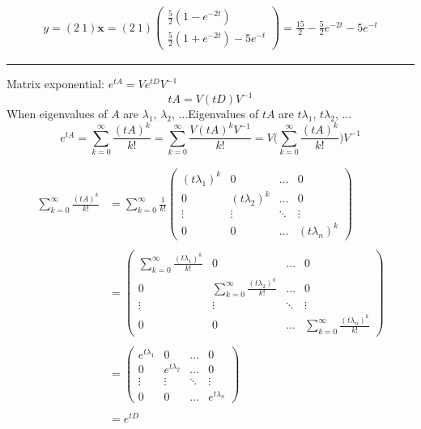 \documentclass[12pt,a4paper]{article}
\begin{document}
\begin{tcolorbox}[breakable]
\begin{gather*}
y = (2 \ 1)\mathbf{x} = (2 \ 1)\begin{pmatrix}
\frac{5}{2}(1-e^{-2t})\\
\frac{5}{2}(1+e^{-2t})-5e^{-t}
\end{pmatrix}
 = \frac{15}{2}-\frac{5}{2}e^{-2t}-5e^{-t}
\end{gather*}

\vspace{.3cm}\hrule\vspace{.3cm}
Matrix exponential: $e^{tA} = Ve^{tD}V^{-1}$
\[tA = V(tD)V^{-1}\]
When eigenvalues of $A$ are $\lambda_{1}$, $\lambda_{2}$, ...Eigenvalues of $tA$ are $t\lambda_{1}$, $t\lambda_{2}$, ...
\[e^{tA} = \sum^{\infty}_{k=0}\frac{(tA)^{k}}{k!} =\sum^{\infty}_{k=0}\frac{V(tA)^{k}V^{-1}}{k!} = V\bigg(\sum^{\infty}_{k=0}\frac{(tA)^{k}}{k!}\bigg)V^{-1} \]

\begin{equation*}
\begin{aligned}
\sum^{\infty}_{k=0}\frac{(tA)^{k}}{k!}  &=\sum^{\infty}_{k=0}\frac{1}{k!} \begin{pmatrix}
(t\lambda_{1})^{k}&0&\ldots&0\\
0&(t\lambda_{2})^{k}&\ldots&0\\
\vdots&\vdots&\ddots&\vdots\\
0&0&\ldots&(t\lambda_{n})^{k}
\end{pmatrix}\\\\
&=\begin{pmatrix}
\sum^{\infty}_{k=0}\frac{(t\lambda_{1})^{k}}{k!} &0&\ldots&0\\
0& \sum^{\infty}_{k=0}\frac{(t\lambda_{2})^{k}}{k!}&\ldots&0\\
\vdots&\vdots&\ddots&\vdots\\
0&0&\ldots&\sum^{\infty}_{k=0}\frac{(t\lambda_{n})^{k}}{k!}
\end{pmatrix}\\\\
&=\begin{pmatrix}
e^{t\lambda_{1}}&0&\ldots&0\\
0&e^{t\lambda_{2}}&\ldots&0\\
\vdots&\vdots&\ddots&\vdots\\
0&0&\ldots&e^{t\lambda_{n}}
\end{pmatrix}\\\\
&= e^{tD}
\end{aligned}
\end{equation*}
\end{tcolorbox}
\end{document}
